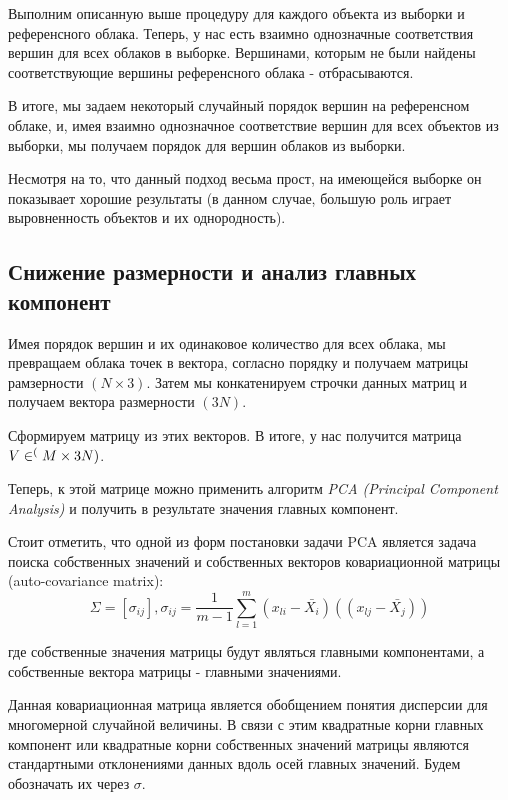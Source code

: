 Выполним описанную выше процедуру для каждого объекта из выборки и референсного облака. Теперь, у нас есть взаимно однозначные соответствия вершин для всех облаков в выборке. Вершинами, которым не были найдены соответствующие вершины референсного облака - отбрасываются.

В итоге, мы задаем некоторый случайный порядок вершин на референсном облаке, и, имея взаимно однозначное соответствие вершин для всех объектов из выборки, мы получаем порядок для вершин облаков из выборки.

Несмотря на то, что данный подход весьма прост, на имеющейся выборке он показывает хорошие результаты (в данном случае, большую роль играет выровненность объектов и их однородность).


\subsection{Снижение размерности и анализ главных компонент}

Имея порядок вершин и их одинаковое количество для всех облака, мы превращаем облака точек в вектора, согласно порядку и получаем матрицы рамзерности $(N \times 3)$. Затем мы конкатенируем строчки данных матриц и получаем вектора размерности $(3N)$.

Сформируем матрицу из этих векторов. В итоге, у нас получится матрица $V \in \real^(M \times 3N)$.

Теперь, к этой матрице можно применить алгоритм \textit{PCA (Principal Component Analysis)} \cite{bishop} и получить в результате значения главных компонент.

Стоит отметить, что одной из форм постановки задачи PCA является задача поиска собственных значений и собственных векторов ковариационной матрицы (auto-covariance matrix): 
\[\Sigma = [\sigma_{ij}], \sigma_{ij} = \frac{1}{m - 1} \sum\limits_{l=1}^{m}(x_{li} - \bar{X_{i}})((x_{lj} - \bar{X_{j}}))\]

где собственные значения матрицы будут являться главными компонентами, а собственные вектора матрицы - главными значениями. 

Данная ковариационная матрица является обобщением понятия дисперсии для многомерной случайной величины. В связи с этим квадратные корни главных компонент или квадратные корни собственных значений матрицы являются стандартными отклонениями данных вдоль осей главных значений. Будем обозначать их через $\sigma$.

